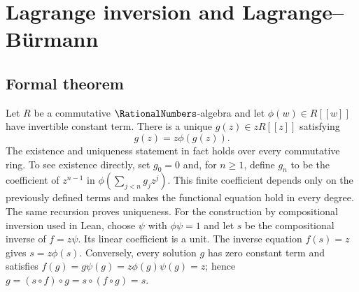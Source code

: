 \documentclass[11pt,a4paper,oneside,openany]{book}
\theoremstyle{definition}
\theoremstyle{remark}
\begin{document}
\chapter{Lagrange inversion and Lagrange--Bürmann}

\section{Formal theorem}
Let $R$ be a commutative $\RationalNumbers$-algebra and let $\phi(w)\in R[[w]]$ have invertible
constant term.  There is a unique $g(z)\in zR[[z]]$ satisfying
\begin{equation}\label{eq:lagrange-functional}
 g(z)=z\phi(g(z)).
\end{equation}
The existence and uniqueness statement in fact holds over every commutative
ring.  To see existence directly, set $g_0=0$ and, for $n\ge1$, define $g_n$
to be the coefficient of $z^{n-1}$ in
$\phi(\sum_{j<n}g_jz^j)$.  This finite coefficient depends only on the
previously defined terms and makes the functional equation hold in every
degree.  The same recursion proves uniqueness.  For the construction by
compositional inversion used in Lean, choose $\psi$ with $\phi\psi=1$ and
let $s$ be the compositional inverse of $f=z\psi$.  Its linear coefficient
is a unit.  The inverse equation $f(s)=z$ gives $s=z\phi(s)$.  Conversely,
every solution $g$ has zero constant term and satisfies
$f(g)=g\psi(g)=z\phi(g)\psi(g)=z$; hence
$g=(s\circ f)\circ g=s\circ(f\circ g)=s$.
\end{document}
